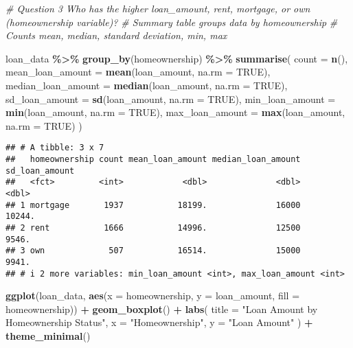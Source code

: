 \documentclass[
]{article}
\newenvironment{Shaded}{\begin{snugshade}}{\end{snugshade}}
\newcommand{\AttributeTok}[1]{\textcolor[rgb]{0.13,0.29,0.53}{#1}}
\newcommand{\CommentTok}[1]{\textcolor[rgb]{0.56,0.35,0.01}{\textit{#1}}}
\newcommand{\ConstantTok}[1]{\textcolor[rgb]{0.56,0.35,0.01}{#1}}
\newcommand{\FunctionTok}[1]{\textcolor[rgb]{0.13,0.29,0.53}{\textbf{#1}}}
\newcommand{\NormalTok}[1]{#1}
\newcommand{\SpecialCharTok}[1]{\textcolor[rgb]{0.81,0.36,0.00}{\textbf{#1}}}
\newcommand{\StringTok}[1]{\textcolor[rgb]{0.31,0.60,0.02}{#1}}
\begin{document}
\begin{Shaded}
\begin{Highlighting}[]
\CommentTok{\# Question 3 Who has the higher loan\_amount, rent, mortgage, or own (homeownership variable)?}
\CommentTok{\# Summary table groups data by homeownership}
\CommentTok{\# Counts mean, median, standard deviation, min, max}

\NormalTok{loan\_data }\SpecialCharTok{\%\textgreater{}\%}
  \FunctionTok{group\_by}\NormalTok{(homeownership) }\SpecialCharTok{\%\textgreater{}\%}
  \FunctionTok{summarise}\NormalTok{(}
    \AttributeTok{count =} \FunctionTok{n}\NormalTok{(),}
    \AttributeTok{mean\_loan\_amount =} \FunctionTok{mean}\NormalTok{(loan\_amount, }\AttributeTok{na.rm =} \ConstantTok{TRUE}\NormalTok{),}
    \AttributeTok{median\_loan\_amount =} \FunctionTok{median}\NormalTok{(loan\_amount, }\AttributeTok{na.rm =} \ConstantTok{TRUE}\NormalTok{),}
    \AttributeTok{sd\_loan\_amount =} \FunctionTok{sd}\NormalTok{(loan\_amount, }\AttributeTok{na.rm =} \ConstantTok{TRUE}\NormalTok{),}
    \AttributeTok{min\_loan\_amount =} \FunctionTok{min}\NormalTok{(loan\_amount, }\AttributeTok{na.rm =} \ConstantTok{TRUE}\NormalTok{),}
    \AttributeTok{max\_loan\_amount =} \FunctionTok{max}\NormalTok{(loan\_amount, }\AttributeTok{na.rm =} \ConstantTok{TRUE}\NormalTok{)}
\NormalTok{  )}
\end{Highlighting}
\end{Shaded}

\begin{verbatim}
## # A tibble: 3 x 7
##   homeownership count mean_loan_amount median_loan_amount sd_loan_amount
##   <fct>         <int>            <dbl>              <dbl>          <dbl>
## 1 mortgage       1937           18199.              16000         10244.
## 2 rent           1666           14996.              12500          9546.
## 3 own             507           16514.              15000          9941.
## # i 2 more variables: min_loan_amount <int>, max_loan_amount <int>
\end{verbatim}

\begin{Shaded}
\begin{Highlighting}[]
\FunctionTok{ggplot}\NormalTok{(loan\_data, }\FunctionTok{aes}\NormalTok{(}\AttributeTok{x =}\NormalTok{ homeownership, }\AttributeTok{y =}\NormalTok{ loan\_amount, }\AttributeTok{fill =}\NormalTok{ homeownership)) }\SpecialCharTok{+}
  \FunctionTok{geom\_boxplot}\NormalTok{() }\SpecialCharTok{+}
  \FunctionTok{labs}\NormalTok{(}
    \AttributeTok{title =} \StringTok{"Loan Amount by Homeownership Status"}\NormalTok{,}
    \AttributeTok{x =} \StringTok{"Homeownership"}\NormalTok{,}
    \AttributeTok{y =} \StringTok{"Loan Amount"}
\NormalTok{  ) }\SpecialCharTok{+}
  \FunctionTok{theme\_minimal}\NormalTok{()}
\end{Highlighting}
\end{Shaded}
\end{document}
